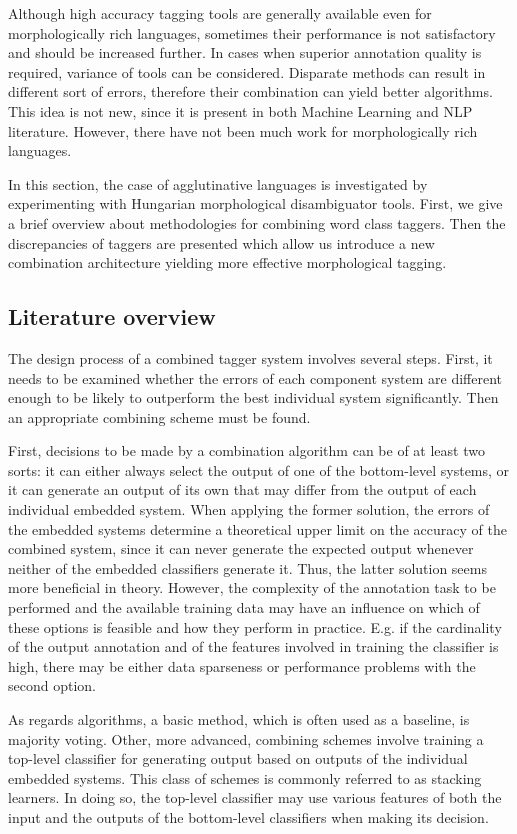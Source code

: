Although high accuracy tagging tools are generally available even for morphologically rich languages, sometimes their performance is not satisfactory and should be increased further. 
In cases when superior annotation quality is required, variance of tools can be considered.
Disparate methods can result in different sort of errors, therefore their combination can yield better algorithms. This idea is not new, since it is present in both Machine Learning and NLP literature. However, there have not been much work for morphologically rich languages. 

In this section, the case of agglutinative languages is investigated by experimenting with Hungarian morphological disambiguator tools. First, we give a brief overview about methodologies for combining word class taggers. Then the discrepancies of taggers are presented which allow us introduce a new combination architecture yielding more effective morphological tagging. 

\subsection{Literature overview}

The design process of a combined tagger system involves several steps. 
First, it needs to be examined whether the errors of each component system are different enough to be likely to outperform the best individual system significantly. 
Then an appropriate combining scheme must be found. 

First, decisions to be made by a combination algorithm can be of at least two sorts: it can either always select the output of one of the bottom-level systems, or it can generate an output of its own that may differ from the output of each individual embedded system. 
When applying the former solution, the errors of the embedded systems determine a theoretical upper limit on the accuracy of the combined system, since it can never generate the expected output whenever neither of the embedded classifiers generate it. Thus, the latter solution seems more beneficial in theory. However, the complexity of the annotation task to be performed and the available training data may have an influence on which of these options is feasible and how they perform in practice. E.g. if the cardinality of the output annotation and of the features involved in training the classifier is high, there may be either data sparseness or performance problems with the second option.

As regards algorithms, a basic method, which is often used as a baseline, is majority voting.
Other, more advanced, combining schemes involve training a top-level classifier for generating output based on outputs of the individual embedded systems.
This class of schemes is commonly referred to as stacking learners. 
In doing so, the top-level classifier may use various features of both the input and the outputs of the bottom-level classifiers when making its decision. 

